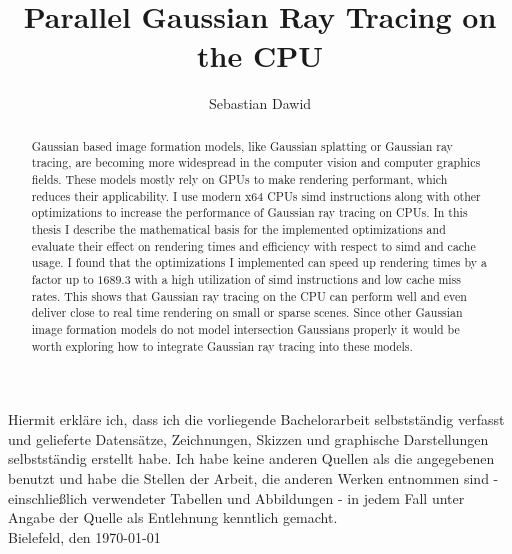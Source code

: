 \documentclass[a4paper, 11pt]{memoir}
\title{Parallel Gaussian Ray Tracing on the CPU}
\author{Sebastian Dawid}
\begin{document}
    \frontmatter
    \smarttitle
    \newpage
    \cleardoublepage
    \thispagestyle{empty}
    \vspace*{\fill}
    {
    \noindent{}Hiermit erkläre ich, dass ich die vorliegende Bachelorarbeit selbstständig verfasst und
    gelieferte Datensätze, Zeichnungen, Skizzen und graphische Darstellungen selbstständig
    erstellt habe. Ich habe keine anderen Quellen als die angegebenen benutzt und habe die
    Stellen der Arbeit, die anderen Werken entnommen sind - einschließlich verwendeter
    Tabellen und Abbildungen - in jedem Fall unter Angabe der Quelle als Entlehnung kenntlich
    gemacht.\\[\baselineskip]
    Bielefeld, den \today}
    \vspace*{2cm}
    \par\noindent\makebox[8cm]{\hrulefill}
    \par\noindent{}
    \cleardoublepage

    \tableofcontents*

    \clearpage
    \thispagestyle{abs}
    \abstractintoc
    \begin{abstract}
        Gaussian based image formation models, like Gaussian splatting or Gaussian ray tracing, are becoming more
        widespread in the computer vision and computer graphics fields.
        These models mostly rely on GPUs to make rendering performant, which reduces their applicability.
        I use modern x64 CPUs \gls{simd} instructions along with other optimizations to increase the performance of
        Gaussian ray tracing on CPUs.
        In this thesis I describe the mathematical basis for the implemented optimizations and evaluate their effect on
        rendering times and efficiency with respect to \gls{simd} and cache usage.
        I found that the optimizations I implemented can speed up rendering times by a factor up to $1689.3$ with a high
        utilization of \gls{simd} instructions and low cache miss rates.
        This shows that Gaussian ray tracing on the CPU can perform well and even deliver close to real time rendering
        on small or sparse scenes.
        Since other Gaussian image formation models do not model intersection Gaussians properly it would be worth exploring
        how to integrate Gaussian ray tracing into these models.
    \end{abstract}
\end{document}
